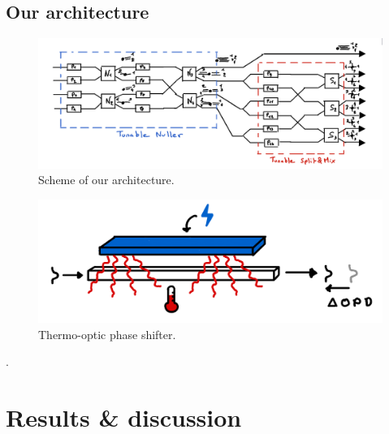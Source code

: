 \documentclass[isoft]{ufgtexposter}
\begin{document}
\begin{poster}
        
        
        \subsection{Our architecture}

        
            \lipsum[54]

            \begin{figure}
                \centering
                \captionsetup{type=figure}
                \includegraphics[scale=1.75]{images/architecture_scheme.png}
                \caption{Scheme of our architecture.}
                \label{fig:architecture_scheme}
            \end{figure}

            \begin{figure}
                \centering
                \captionsetup{type=figure}
                \includegraphics[scale=0.25]{images/thermo-optic_phase_shifter.png}
                \caption{Thermo-optic phase shifter.}
                \label{fig:thermo-optic_phase_shifter}
            \end{figure}

            
            \citep{defects2j}.
    
        \section{Results \& discussion}%
                
            \lipsum[4]    
    

\end{poster}
\end{document}
